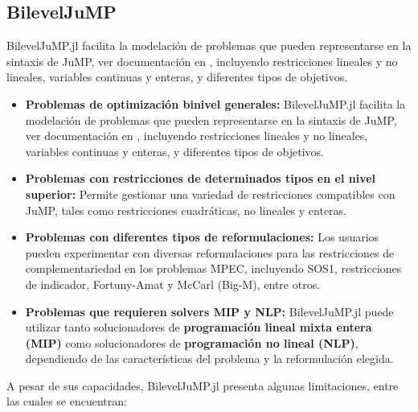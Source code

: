 \subsection*{BilevelJuMP}
BilevelJuMP.jl facilita la modelación de problemas que pueden representarse en la sintaxis de JuMP, ver documentación en \cite{JuMPPaper}, incluyendo restricciones lineales y no lineales, variables continuas y enteras, y diferentes tipos de objetivos.
\begin{itemize}
    \item \textbf{Problemas de optimización binivel generales:} BilevelJuMP.jl facilita la modelación de problemas que pueden representarse en la sintaxis de JuMP, ver documentación en \cite{JuMPPaper}, incluyendo restricciones lineales y no lineales, variables continuas y enteras, y diferentes tipos de objetivos.
    
    \item \textbf{Problemas con restricciones de determinados tipos en el nivel superior:} Permite gestionar una variedad de restricciones compatibles con JuMP, tales como restricciones cuadráticas, no lineales y enteras.
    
    
    
    \item \textbf{Problemas con diferentes tipos de reformulaciones:} Los usuarios pueden experimentar con diversas reformulaciones para las restricciones de complementariedad en los problemas MPEC, incluyendo SOS1, restricciones de indicador, Fortuny-Amat y McCarl (Big-M), entre otros.
    \item \textbf{Problemas que requieren solvers MIP y NLP:} BilevelJuMP.jl puede utilizar tanto solucionadores de \textbf{programación lineal mixta entera (MIP)} como solucionadores de \textbf{programación no lineal (NLP)}, dependiendo de las características del problema y la reformulación elegida.
\end{itemize}


A pesar de sus capacidades, BilevelJuMP.jl presenta algunas limitaciones, entre las cuales se encuentran:


